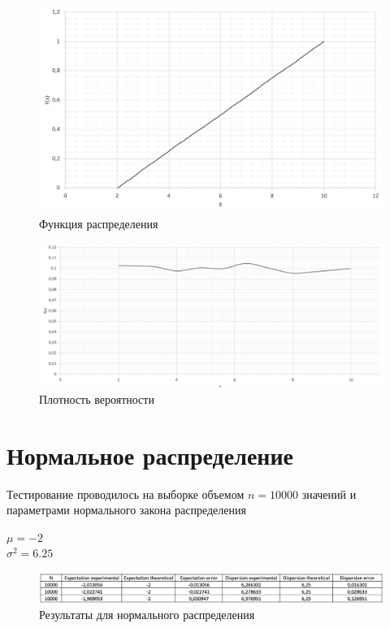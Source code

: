\documentclass{article}
\begin{document}
		\begin{figure}[!htb]
		    \includegraphics[scale = 0.4]{uniform/2.png}
    		\caption{Функция распределения}
		\end{figure}
		 	 	
		\begin{figure}[!htb]
			\includegraphics[scale = 0.3]{uniform/3.png}
			\caption{Плотность вероятности}
   		\end{figure}
   	\newpage
										
	\section{Нормальное распределение}
		Тестирование проводилось на выборке объемом $n = 10000$ значений и параметрами нормального закона распределения
		\begin{center}
			$\mu = -2$\\ 
			$\sigma^2 = 6.25$\\
		\end{center}
		\begin{center}
			\begin{figure}[!htb]
				\includegraphics[scale = 0.5]{normal/1.png}
				\caption{Результаты для нормального распределения}
			\end{figure}
		\end{center}
		
\end{document}
